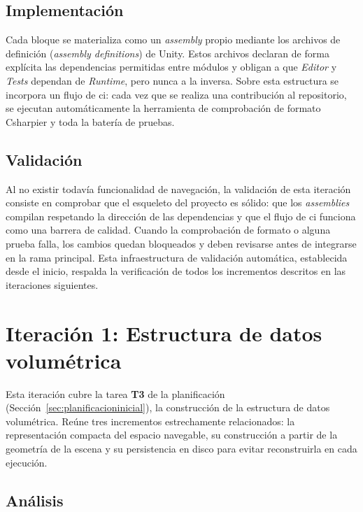 \subsection{Implementación}

Cada bloque se materializa como un \textit{assembly} propio mediante los archivos de definición (\textit{assembly definitions}) de Unity.
Estos archivos declaran de forma explícita las dependencias permitidas entre módulos y obligan a que \textit{Editor} y \textit{Tests} dependan de \textit{Runtime}, pero nunca a la inversa.
Sobre esta estructura se incorpora un flujo de \acrshort{ci}: cada vez que se realiza una contribución al repositorio, se ejecutan automáticamente la herramienta de comprobación de formato Csharpier y toda la batería de pruebas.

\subsection{Validación}

Al no existir todavía funcionalidad de navegación, la validación de esta iteración consiste en comprobar que el esqueleto del proyecto es sólido: que los \textit{assemblies} compilan respetando la dirección de las dependencias y que el flujo de \acrshort{ci} funciona como una barrera de calidad.
Cuando la comprobación de formato o alguna prueba falla, los cambios quedan bloqueados y deben revisarse antes de integrarse en la rama principal.
Esta infraestructura de validación automática, establecida desde el inicio, respalda la verificación de todos los incrementos descritos en las iteraciones siguientes.

\section{Iteración 1: Estructura de datos volumétrica}
\label{sec:iter-representacion}

Esta iteración cubre la tarea \textbf{T3} de la planificación (Sección~\ref{sec:planificacioninicial}), la construcción de la estructura de datos volumétrica.
Reúne tres incrementos estrechamente relacionados: la representación compacta del espacio navegable, su construcción a partir de la geometría de la escena y su persistencia en disco para evitar reconstruirla en cada ejecución.

\subsection{Análisis}

